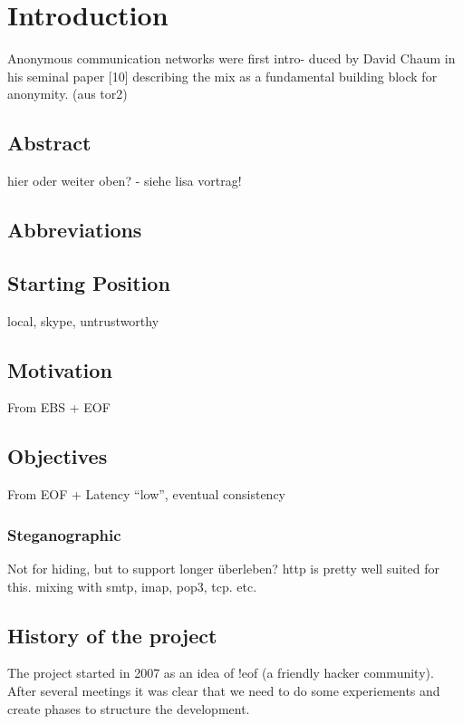 \chapter{Introduction}

Anonymous communication networks were first intro-
duced by David Chaum in his seminal paper [10] describing
the mix as a fundamental building block for anonymity.
(aus tor2)

\section{Abstract}
hier oder weiter oben? - siehe lisa vortrag!

\section{Abbreviations}
\section{Starting Position}
local, skype, untrustworthy

\section{Motivation}
From EBS + EOF

\section{Objectives}
From EOF + Latency "`low"', eventual consistency

\subsection{Steganographic}
Not for hiding, but to support longer überleben?
http is pretty well suited for this.
mixing with smtp, imap, pop3, tcp. etc.

\section{History of the project}
The project started in 2007 as an idea of !eof\cite{!eof}
(a friendly hacker community). After several meetings it was clear that
we need to do some experiements and create phases to structure the
development.

